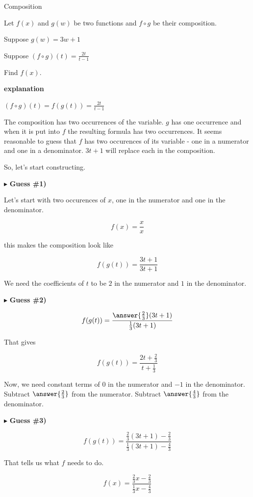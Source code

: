 \documentclass{ximera}
\begin{document}
\begin{example} Composition


Let $f(x)$ and $g(w)$ be two functions and $f \circ g$ be their composition.


Suppose $g(w) = 3w + 1$ 

Suppose $(f \circ g)(t) = \frac{2t}{t-1}$


Find $f(x)$.



\textbf{\textcolor{red!75!green}{explanation}} 




$(f \circ g)(t) =  f(g(t)) =  \frac{2t}{t-1}$ 



The composition has two occurrences of the variable.  $g$ has one occurrence and when it is put into $f$ the resulting formula has two occurrences.  It seems reasonable to guess that $f$ has two occurences of its variable - one in a numerator and one in a denominator.  $3t + 1$ will replace each in the composition.

So, let's start constructing. 


$\blacktriangleright$  \textbf{\textcolor{blue!55!black}{Guess \#1)}}   

Let's start with two occurences of $x$, one in the numerator and one in the denominator.

\[      f(x) = \frac{x}{x}       \]


this makes the composition look like

\[   f(g(t)) =      \frac{3t + 1}{3t + 1}       \]



We need the coefficients of $t$ to be $2$ in the numerator and $1$ in the denominator.

$\blacktriangleright$  \textbf{\textcolor{blue!55!black}{Guess \#2)}}   

\[   f(g(t)) =      \frac{\answer{\frac{2}{3}}(3t + 1)}{\frac{1}{3}(3t + 1)}       \]

That gives


\[   f(g(t)) =      \frac{2t + \frac{2}{3}}{t + \frac{1}{3}}       \]



Now, we need constant terms of $0$ in the numerator and $-1$ in the denominator.  Subtract $\answer{\frac{2}{3}}$ from the numerator. Subtract $\answer{\frac{4}{3}}$ from the denominator. 

$\blacktriangleright$  \textbf{\textcolor{blue!55!black}{Guess \#3)}}   


\[   f(g(t)) =      \frac{\frac{2}{3}(3t + 1) - \frac{2}{3}}{\frac{1}{3}(3t + 1) - \frac{4}{3}}       \]

That tells us what $f$ needs to do.




\[   f(x) =      \frac{\frac{2}{3}x - \frac{2}{3}}{\frac{1}{3}x - \frac{4}{3}}       \]





\end{example}
\end{document}
